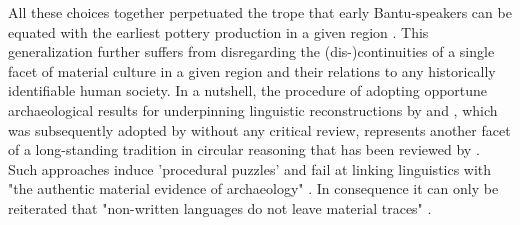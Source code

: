 All these choices together perpetuated the trope that early Bantu-speakers can be equated with the earliest pottery production in a given region \citep[355,362,364]{Bostoen.2015}. This generalization further suffers from disregarding the (dis-)continuities of a single facet of material culture in a given region and their relations to any historically identifiable human society. In a nutshell, the procedure of adopting opportune archaeological results for underpinning linguistic reconstructions by \citet{Grollemund.2015} and \citet{Bostoen.2015}, which was subsequently adopted by \citet[SI]{Koile.2022} without any critical review, represents another facet of a long-standing tradition in circular reasoning \citep{Ehret.1973,Phillipson.1976,Phillipson.1976b,Phillipson.1977a,Heine.1977} that has been reviewed by \citet[82]{Eggert.2005,Eggert.2016a}. Such approaches induce 'procedural puzzles' and fail at linking linguistics with "the authentic material evidence of archaeology" \citep[88]{Eggert.2016a}. In consequence it can only be reiterated that "non-written languages do not leave material traces" \citep[85]{Eggert.2016a}.